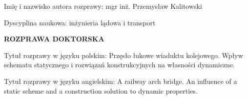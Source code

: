 \begin{titlepage}
	\begin{figure}
		\hfill
	\end{figure}
	
	\begin{myfont}
		\vspace*{0cm}
		
		\footnotesize \noindent
		Imię i nazwisko autora rozprawy: mgr inż. Przemysław Kalitowski
		
		\noindent
		Dyscyplina naukowa: inżynieria lądowa i transport
		
		\vspace{3.5cm}
		
		\normalsize \noindent
		\textbf{ROZPRAWA DOKTORSKA}
		
		\vspace{3.5cm}
		
		\footnotesize \noindent%
		Tytuł rozprawy w języku polskim: Przęsło łukowe wiaduktu kolejowego. Wpływ schematu statycznego i rozwiązań konstrukcyjnych na własności dynamiczne.%
		
		\vspace{0.5cm}
		
		\noindent%
		Tytuł rozprawy w języku angielskim: A railway arch bridge. An influence of a static scheme and a construction solution to dynamic properties.
		
		\vfill
		

\end{myfont}
\end{titlepage}

